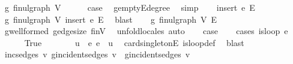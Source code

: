 \begin{isabellebody}
\ g{\isacharcolon}{\kern0pt}\ fin{\isacharunderscore}{\kern0pt}ulgraph\ V\ {\isachardoublequoteopen}{\isacharbraceleft}{\kern0pt}{\isacharbraceright}{\kern0pt}{\isachardoublequoteclose}\ \isacommand{{\isachardot}{\kern0pt}}\isamarkupfalse%
\isanewline
\ \ \isamarkupfalse%
\ {\isacharquery}{\kern0pt}case\ \isamarkupfalse%
\ g{\isachardot}{\kern0pt}empty{\isacharunderscore}{\kern0pt}E{\isacharunderscore}{\kern0pt}degree{\isacharunderscore}{\kern0pt}{}\ \isamarkupfalse%
\ simp\isanewline
{}\isamarkupfalse%
\isanewline
\ \ \isamarkupfalse%
\ {\isacharparenleft}{\kern0pt}insert\ e\ E{\isacharprime}{\kern0pt}{\isacharparenright}{\kern0pt}\isanewline
\ \ \isamarkupfalse%
\ \isamarkupfalse%
\ g{\isacharprime}{\kern0pt}{\isacharcolon}{\kern0pt}\ fin{\isacharunderscore}{\kern0pt}ulgraph\ V\ {\isachardoublequoteopen}insert\ e\ E{\isacharprime}{\kern0pt}{\isachardoublequoteclose}\ \isamarkupfalse%
\ blast\isanewline
\ \ \isamarkupfalse%
\ g{\isacharcolon}{\kern0pt}\ fin{\isacharunderscore}{\kern0pt}ulgraph\ V\ E{\isacharprime}{\kern0pt}\ \isamarkupfalse%
\ g{\isacharprime}{\kern0pt}{\isachardot}{\kern0pt}wellformed\ g{\isacharprime}{\kern0pt}{\isachardot}{\kern0pt}edge{\isacharunderscore}{\kern0pt}size\ finV\ \isamarkupfalse%
\ {\isacharparenleft}{\kern0pt}unfold{\isacharunderscore}{\kern0pt}locales{\isacharcomma}{\kern0pt}\ auto{\isacharparenright}{\kern0pt}\isanewline
\ \ \isamarkupfalse%
\ {\isacharquery}{\kern0pt}case\isanewline
\ \ \isamarkupfalse%
\ {\isacharparenleft}{\kern0pt}cases\ {\isachardoublequoteopen}is{\isacharunderscore}{\kern0pt}loop\ e{\isachardoublequoteclose}{\isacharparenright}{\kern0pt}\isanewline
\ \ \ \ \isamarkupfalse%
\ True\isanewline
\ \ \ \ \isamarkupfalse%
\ \isamarkupfalse%
\ u\ \ e{\isacharcolon}{\kern0pt}\ {\isachardoublequoteopen}e\ {\isacharequal}{\kern0pt}\ {\isacharbraceleft}{\kern0pt}u{\isacharbraceright}{\kern0pt}{\isachardoublequoteclose}\ \isamarkupfalse%
\ card{\isacharunderscore}{\kern0pt}{}{\isacharunderscore}{\kern0pt}singletonE\ is{\isacharunderscore}{\kern0pt}loop{\isacharunderscore}{\kern0pt}def\ \isamarkupfalse%
\ blast\isanewline
\ \ \ \ \isamarkupfalse%
\ \isamarkupfalse%
\ inc{\isacharunderscore}{\kern0pt}sedges{\isacharcolon}{\kern0pt}\ {\isachardoublequoteopen}{\isasymAnd}v{\isachardot}{\kern0pt}\ g{\isacharprime}{\kern0pt}{\isachardot}{\kern0pt}incident{\isacharunderscore}{\kern0pt}sedges\ v\ {\isacharequal}{\kern0pt}\ g{\isachardot}{\kern0pt}incident{\isacharunderscore}{\kern0pt}sedges\ v{\isachardoublequoteclose}\ \isamarkupfalse%

\end{isabellebody}
